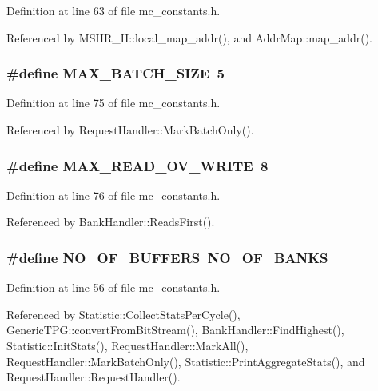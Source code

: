 Definition at line 63 of file mc\_\-constants.h.

Referenced by MSHR\_\-H::local\_\-map\_\-addr(), and AddrMap::map\_\-addr().
\subsubsection[{MAX\_\-BATCH\_\-SIZE}]{\setlength{\rightskip}{0pt plus 5cm}\#define {\bf MAX\_\-BATCH\_\-SIZE}~5}\label{mc__constants_8h_18373cd65e0761a3bd4e760a8e015baa}




Definition at line 75 of file mc\_\-constants.h.

Referenced by RequestHandler::MarkBatchOnly().
\subsubsection[{MAX\_\-READ\_\-OV\_\-WRITE}]{\setlength{\rightskip}{0pt plus 5cm}\#define {\bf MAX\_\-READ\_\-OV\_\-WRITE}~8}\label{mc__constants_8h_807dcc509b3155f4be5d3979e3d910dd}




Definition at line 76 of file mc\_\-constants.h.

Referenced by BankHandler::ReadsFirst().
\subsubsection[{NO\_\-OF\_\-BUFFERS}]{\setlength{\rightskip}{0pt plus 5cm}\#define {\bf NO\_\-OF\_\-BUFFERS}~{\bf NO\_\-OF\_\-BANKS}}\label{mc__constants_8h_a9f2d328954a62b047317e13f33bda12}




Definition at line 56 of file mc\_\-constants.h.

Referenced by Statistic::CollectStatsPerCycle(), GenericTPG::convertFromBitStream(), BankHandler::FindHighest(), Statistic::InitStats(), RequestHandler::MarkAll(), RequestHandler::MarkBatchOnly(), Statistic::PrintAggregateStats(), and RequestHandler::RequestHandler().
